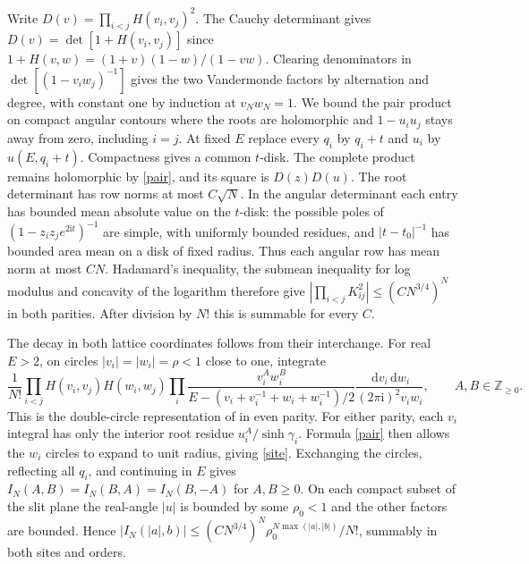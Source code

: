\documentclass[11pt]{article}
\newcommand{\ii}{\mathrm i}
\newcommand{\dd}{\,\mathrm d}
\newcommand{\Z}{\mathbb Z}
\begin{document}
Write $D(v)=\prod_{i<j}H(v_i,v_j)^2$. The Cauchy determinant gives
$D(v)=\det[1+H(v_i,v_j)]$ since $1+H(v,w)=(1+v)(1-w)/(1-vw)$.
Clearing denominators in $\det[(1-v_iw_j)^{-1}]$ gives the two
Vandermonde factors by alternation and degree, with constant one by
induction at $v_Nw_N=1$.
We bound the pair product on compact angular contours where the roots
are holomorphic and $1-u_i u_j$ stays away from zero, including $i=j$.
At fixed $E$ replace every $q_i$ by $q_i+t$ and $u_i$ by $u(E,q_i+t)$.
Compactness gives a common $t$-disk. The complete product remains
holomorphic by \eqref{pair}, and its square is $D(z)D(u)$.
The root determinant has row norms at most $C\sqrt N$. In the angular
determinant each entry has bounded mean absolute value on the $t$-disk:
the possible poles of $(1-z_i z_j e^{2\ii t})^{-1}$ are simple,
with uniformly bounded residues, and $|t-t_0|^{-1}$ has bounded area
mean on a disk of fixed radius. Thus each angular row has mean norm
at most $CN$. Hadamard's inequality, the submean inequality for
log modulus and concavity of the logarithm therefore give
$|\prod_{i<j}K_{ij}^2|\le(C N^{3/4})^N$ in both parities.
After division by $N!$ this is summable for every $C$.

The decay in both lattice coordinates follows from their interchange.
For real $E>2$, on circles $|v_i|=|w_i|=\rho<1$ close to one, integrate
\[
 \frac1{N!}\prod_{i<j}H(v_i,v_j)H(w_i,w_j)
 \prod_i\frac{v_i^A w_i^B}
 {E-(v_i+v_i^{-1}+w_i+w_i^{-1})/2}
 \frac{\dd v_i\dd w_i}{(2\pi\ii)^2v_iw_i},\qquad A,B\in\Z_{\ge0}.
\]
This is the double-circle representation of \cite[Appendix~1]{TW}
in even parity. For either parity, each $v_i$ integral has only the
interior root residue $u_i^A/\sinh\gamma_i$. Formula \eqref{pair}
then allows the $w_i$ circles to expand to unit radius, giving
\eqref{site}. Exchanging the circles, reflecting all $q_i$, and
continuing in $E$ gives $I_N(A,B)=I_N(B,A)=I_N(B,-A)$ for $A,B\ge0$.
On each compact subset of the slit plane the real-angle $|u|$ is
bounded by some $\rho_0<1$ and the other factors are bounded. Hence
$|I_N(|a|,b)|\le (C N^{3/4})^N\rho_0^{N\max(|a|,|b|)}/N!$, summably
in both sites and orders.
\end{document}

